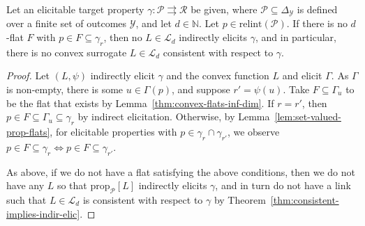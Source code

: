 \documentclass[anon,12pt]{colt2021} %
\newcommand{\Comments}{1}
\newcommand{\mynote}[2]{\ifnum\Comments=1\textcolor{#1}{#2}\fi}
\newcommand{\jessie}[1]{\mynote{purple}{[JF: #1]}}
\newcommand{\simplex}{\Delta_\Y}
\newcommand{\relint}[1]{\mathrm{relint}(#1)}
\newcommand{\prop}[2][\mathcal{P}]{\mathrm{prop}_{#1}[#2]}
\newcommand{\range}{\mathrm{range}\,}
\newcommand{\Pcodimension}{$\mathcal{P}$-codimension\,}
\renewcommand{\L}{\mathcal{L}}
\newcommand{\R}{\mathcal{R}}
\renewcommand{\P}{\mathcal{P}}
\newcommand{\Y}{\mathcal{Y}}
\newcommand{\toto}{\rightrightarrows}
\begin{document}

\begin{corollary}\label{cor:Pcodim-flat-elic-relint-prop} 
  Let an elicitable target property $\gamma:\P \toto \R$ be given, where $\P\subseteq\simplex$ is defined over a finite set of outcomes $\Y$, and let $d\in\mathbb N$.
Let $p \in \relint{\P}$.
If there is no $d$-flat $F$ with $p \in F \subseteq \gamma_r$, then no $L\in\L_d$ indirectly elicits $\gamma$, and in particular, there is no convex surrogate $L \in \L_d$ consistent with respect to $\gamma$.
%
\end{corollary}
\begin{proof}
	Let $(L, \psi)$ indirectly elicit $\gamma$ and the convex function $L$ and elicit $\Gamma$.
	As $\Gamma$ is non-empty, there is some $u \in \Gamma(p)$, and suppose $r' = \psi(u)$.
	Take $F \subseteq \Gamma_u$ to be the flat that exists by Lemma~\ref{thm:convex-flats-inf-dim}.
	If $r = r'$, then $p \in F \subseteq \Gamma_u \subseteq \gamma_r$ by indirect elicitation.
	Otherwise, by Lemma~\ref{lem:set-valued-prop-flats}, for elicitable properties with $p \in \gamma_r \cap \gamma_{r'}$, we observe $p \in F\subseteq \gamma_r \iff p \in F \subseteq \gamma_{r'}$.
	
	As above, if we do not have a flat satisfying the above conditions, then we do not have any $L$ so that $\prop{L}$ indirectly elicits $\gamma$, and in turn do not have a link such that $L \in \L_d$ is consistent with respect to $\gamma$ by Theorem~\ref{thm:consistent-implies-indir-elic}.
\end{proof}
\end{document}
